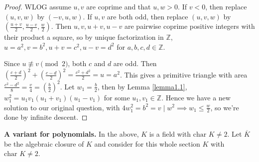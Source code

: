 \documentclass{article}
\theoremstyle{definition}
\begin{document}
\begin{proof}
    WLOG assume $u,v$ are coprime and that $u,w > 0$. If $v<0$, then replace $(u,v,w)$ by $(-v,u,w)$. If $u,v$ are both odd, then replace $(u,v,w)$ by $\left(\frac{u+v}{2},\frac{u-v}{2},\frac{w}{2}\right)$. Then $u,v,u+v,u-v$ are pairwise coprime positive integers with their product a square, so by unique factorization in $\mathbb{Z}$, $u=a^2, v = b^2, u+v = c^2, u-v = d^2$ for $a,b,c,d \in \mathbb{Z}$. 
    \vspace{1mm}
     
    Since $u \not\equiv v \pmod{2}$, both $c$ and $d$ are odd. Then $\left(\frac{c+d}{2}\right)^2 + \left(\frac{c-d}{2}\right)^2 = \frac{c^2+d^2}{2} = u = a^2$. This gives a primitive triangle with area $\frac{c^2-d^2}{8} = \frac{v}{4} = \left(\frac{b}{2}\right)^2$. Let $w_1 = \frac{b}{2}$, then by Lemma \ref{lemma1.1}, $w_1^2 = u_1v_1(u_1+v_1)(u_1-v_1)$ for some $u_1, v_1 \in \mathbb{Z}$. Hence we have a new solution to our original question, with $4w_1^2 = b^2 = v \mid w^2 \implies w_1 \le \frac{w}{2}$, so we're done by infinite descent.
\end{proof}
\vspace{1mm}
 
\textbf{A variant for polynomials.} In the above, $K$ is a field with $\text{char }K \neq 2$. Let $\overline{K}$ be the algebraic closure of $K$ and consider for this whole section $K$ with $\text{char }K \neq 2$.
\end{document}
